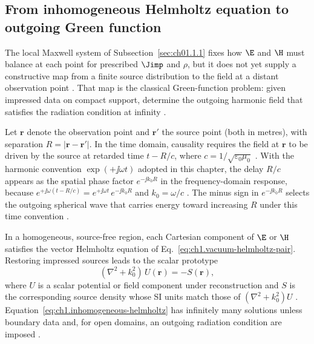 \subsection{From inhomogeneous Helmholtz equation to outgoing Green function}
\label{sec:ch01.1.1c}

The local Maxwell system of Subsection~\ref{sec:ch01.1.1} fixes how $\E$ and $\H$ must balance at each point for prescribed $\Jimp$ and $\rho$, but it does not yet supply a constructive map from a finite source distribution to the field at a distant observation point \cite{stratton1941,maxwell1873}. That map is the classical Green-function problem: given impressed data on compact support, determine the outgoing harmonic field that satisfies the radiation condition at infinity \cite{stratton1941,jackson1999}.

Let $\mathbf{r}$ denote the observation point and $\mathbf{r}'$ the source point (both in metres), with separation $R=|\mathbf{r}-\mathbf{r}'|$. In the time domain, causality requires the field at $\mathbf{r}$ to be driven by the source at retarded time $t-R/c$, where $c=1/\sqrt{\varepsilon_0\mu_0}$ \cite{stratton1941,jackson1999}. With the harmonic convention $\exp(+\jj\omega t)$ adopted in this chapter, the delay $R/c$ appears as the spatial phase factor $e^{-\jj k_0 R}$ in the frequency-domain response, because $e^{+\jj\omega(t-R/c)}=e^{+\jj\omega t}\,e^{-\jj k_0 R}$ and $k_0=\omega/c$ \cite{stratton1941}. The minus sign in $e^{-\jj k_0 R}$ selects the outgoing spherical wave that carries energy toward increasing $R$ under this time convention \cite{stratton1941,jackson1999}.

In a homogeneous, source-free region, each Cartesian component of $\E$ or $\H$ satisfies the vector Helmholtz equation of Eq.~\eqref{eq:ch1.vacuum-helmholtz-pair}. Restoring impressed sources leads to the scalar prototype
\begin{equation}
\label{eq:ch1.inhomogeneous-helmholtz}
(\nabla^2+k_0^2)\,U(\mathbf{r})=-S(\mathbf{r}),
\end{equation}
where $U$ is a scalar potential or field component under reconstruction and $S$ is the corresponding source density whose SI units match those of $(\nabla^2+k_0^2)U$ \cite{stratton1941,jackson1999}. Equation~\eqref{eq:ch1.inhomogeneous-helmholtz} has infinitely many solutions unless boundary data and, for open domains, an outgoing radiation condition are imposed \cite{stratton1941}.

